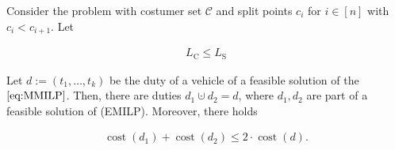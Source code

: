 \begin{theorem}

Consider the problem with costumer set $\mathcal{C}$ and split points $c_i$ for $i\in[n]$ with $c_i<c_{i+1}$. Let

\begin{align}
\label{eq:LCLS}
	L_{\operatorname{C}}\leq L_{\operatorname{S}}
\end{align}

Let $d:=\left(t_1,\dots,t_k\right)$ be the duty of a vehicle of a feasible solution of the $\eqref{eq:MMILP}$. Then, there are duties $d_1\cupdot d_2=d$, where $d_1,d_2$ are part of a feasible solution of (EMILP). Moreover, there holds

\begin{align}
	\operatorname{cost}\left(d_1\right)+\operatorname{cost}\left(d_2\right)\leq 2\cdot\operatorname{cost}\left(d\right).
\end{align}

\end{theorem}

